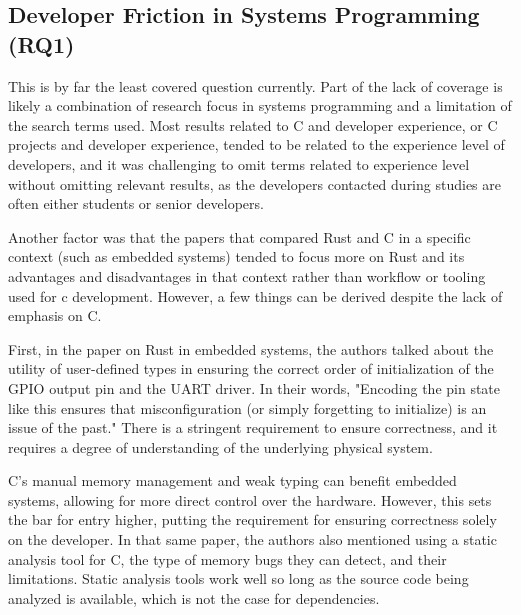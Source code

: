 \documentclass[conference]{IEEEtran}
\begin{document}


\subsection{Developer Friction in Systems Programming (RQ1)}

This is by far the least covered question currently. Part of the lack of coverage is likely a combination of research focus in systems programming and a limitation of the search terms used. Most results related to C and developer experience, or C projects and developer experience, tended to be related to the experience level of developers, and it was challenging to omit terms related to experience level without omitting relevant results, as the developers contacted during studies are often either students or senior developers.

Another factor was that the papers that compared Rust and C in a specific context (such as embedded systems\cite{nosedaRustSecureIoT2022}) tended to focus more on Rust
and its advantages and disadvantages in that context rather than workflow or tooling used for c development. However, a few things can be derived despite the lack of emphasis on C.

First, in the paper on Rust in embedded systems\cite{nosedaRustSecureIoT2022}, the authors talked about the utility of user-defined types in ensuring the correct order of initialization of the GPIO output pin and the UART driver. In their words, "Encoding the pin state like this ensures that misconfiguration (or simply forgetting to initialize) is an issue of the past." There is a stringent requirement to ensure correctness, and it requires a degree of understanding of the underlying physical system.

C's manual memory management and weak typing can benefit embedded systems, allowing for more direct control over the hardware. However, this sets the bar for entry higher, putting the requirement for ensuring correctness solely on the developer. In that same paper, the authors also mentioned using a static analysis tool for C, the type of memory bugs they can detect, and their limitations. Static analysis tools work well so long as the source code being analyzed is available, which is not the case for dependencies.
\end{document}
